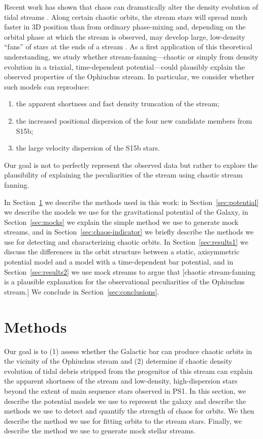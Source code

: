 \documentclass[letterpaper,12pt,preprint]{aastex}
\begin{document}
Recent work has shown that chaos can dramatically alter the density evolution of tidal streams \citep[e.g.,][]{fardal14, apw15-chaos}. Along certain chaotic orbits, the stream stars will spread much faster in 3D position than from ordinary phase-mixing and, depending on the orbital phase at which the stream is observed, may develop large, low-density ``fans'' of stars at the ends of a stream \citep{pearson15, apw15-chaos}. As a first application of this theoretical understanding, we study whether stream-fanning---chaotic or simply from density evolution in a triaxial, time-dependent potential---could plausibly explain the observed properties of the Ophiuchus stream. In particular, we consider whether such models can reproduce:
\begin{enumerate}
	\item the apparent shortness and fast density truncation of the stream;
	\item the increased positional dispersion of the four new candidate members from S15b;
	\item the large velocity dispersion of the S15b stars.
\end{enumerate}
Our goal is not to perfectly represent the observed data but rather to explore the plausibility of explaining the peculiarities of the stream using chaotic stream fanning.

In Section~\ref{sec:method} we describe the methods used in this work: in Section~\ref{sec:potential} we describe the models we use for the gravitational potential of the Galaxy, in Section~\ref{sec:mocks} we explain the simple method we use to generate mock streams, and in Section~\ref{sec:chaos-indicator} we briefly describe the methods we use for detecting and characterizing chaotic orbits. In Section~\ref{sec:results1} we discuss the differences in the orbit structure between a static, axisymmetric potential model and a model with a time-dependent bar potential, and in Section~\ref{sec:results2} we use mock streams to argue that [chaotic stream-fanning is a plausible explanation for the observational peculiarities of the Ophiuchus stream.] We conclude in Section~\ref{sec:conclusions}.

\section{Methods}\label{sec:method}

Our goal is to (1) assess whether the Galactic bar can produce chaotic orbits in the vicinity of the Ophiuchus stream and (2) determine if chaotic density evolution of tidal debris stripped from the progenitor of this stream can explain the apparent shortness of the stream and low-density, high-dispersion stars beyond the extent of main sequence stars observed in PS1. In this section, we describe the potential models we use to represent the galaxy and describe the methods we use to detect and quantify the strength of chaos for orbits. We then describe the method we use for fitting orbits to the stream stars. Finally, we describe the method we use to generate mock stellar streams. 
\end{document}
